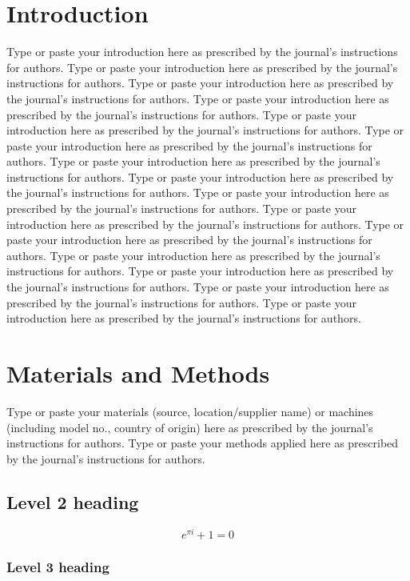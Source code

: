 \documentclass[12pt,a4paper,twoside]{article}
\begin{document}
\section*{Introduction}
Type or paste your introduction here as prescribed by the journal’s instructions for authors. Type or paste your introduction here as prescribed by the journal’s instructions for authors. Type or paste your introduction here as prescribed by the journal’s instructions for authors. Type or paste your introduction here as prescribed by the journal’s instructions for authors. Type or paste your introduction here as prescribed by the journal’s instructions for authors.
Type or paste your introduction here as prescribed by the journal’s instructions for authors. Type or paste your introduction here as prescribed by the journal’s instructions for authors. Type or paste your introduction here as prescribed by the journal’s instructions for authors. Type or paste your introduction here as prescribed by the journal’s instructions for authors. Type or paste your introduction here as prescribed by the journal’s instructions for authors. 
Type or paste your introduction here as prescribed by the journal’s instructions for authors. Type or paste your introduction here as prescribed by the journal’s instructions for authors. Type or paste your introduction here as prescribed by the journal’s instructions for authors. Type or paste your introduction here as prescribed by the journal’s instructions for authors. Type or paste your introduction here as prescribed by the journal’s instructions for authors. 
\section*{Materials and Methods}
Type or paste your materials (source, location/supplier name) or machines (including model no., country of origin) here as prescribed by the journal’s instructions for authors.
Type or paste your methods applied here as prescribed by the journal’s instructions for authors.
\subsection*{Level 2 heading}

\begin{equation} 
\label{eu_eqn}
e^{\pi i} + 1 = 0
\end{equation}
\subsubsection*{Level 3 heading}
\end{document}
